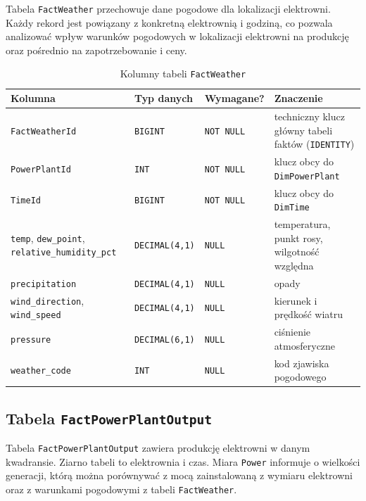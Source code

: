\documentclass[12pt]{article}
\begin{document}
	Tabela \texttt{FactWeather} przechowuje dane pogodowe dla lokalizacji elektrowni. Każdy rekord jest powiązany z konkretną elektrownią i godziną, co pozwala analizować wpływ warunków pogodowych w lokalizacji elektrowni na produkcję oraz pośrednio na zapotrzebowanie i ceny.

	\begin{table}[H]
		\centering
		\small
		\begin{tabularx}{\textwidth}{|p{4.0cm}|p{2.2cm}|p{2.5cm}|X|}
			\hline
			\textbf{Kolumna} & \textbf{Typ danych} & \textbf{Wymagane?} & \textbf{Znaczenie} \\
			\hline
			\texttt{FactWeatherId} & \texttt{BIGINT} & \texttt{NOT NULL} & techniczny klucz główny tabeli faktów (\texttt{IDENTITY}) \\
			\hline
			\texttt{PowerPlantId} & \texttt{INT} & \texttt{NOT NULL} & klucz obcy do \texttt{DimPowerPlant} \\
			\hline
			\texttt{TimeId} & \texttt{BIGINT} & \texttt{NOT NULL} & klucz obcy do \texttt{DimTime} \\
			\hline
			\texttt{temp}, \texttt{dew\_point}, \texttt{relative\_humidity\_pct} & \texttt{DECIMAL(4,1)} & \texttt{NULL} & temperatura, punkt rosy, wilgotność względna \\
			\hline
			\texttt{precipitation} & \texttt{DECIMAL(4,1)} & \texttt{NULL} & opady \\
			\hline
			\texttt{wind\_direction}, \texttt{wind\_speed} & \texttt{DECIMAL(4,1)} & \texttt{NULL} & kierunek i prędkość wiatru \\
			\hline
			\texttt{pressure} & \texttt{DECIMAL(6,1)} & \texttt{NULL} & ciśnienie atmosferyczne \\
			\hline
			\texttt{weather\_code} & \texttt{INT} & \texttt{NULL} & kod zjawiska pogodowego \\
			\hline
		\end{tabularx}
		\caption{Kolumny tabeli \texttt{FactWeather}}
	\end{table}

	\subsection{Tabela \texttt{FactPowerPlantOutput}}

	Tabela \texttt{FactPowerPlantOutput} zawiera produkcję elektrowni w danym kwadransie. Ziarno tabeli to elektrownia i czas. Miara \texttt{Power} informuje o wielkości generacji, którą można porównywać z mocą zainstalowaną z wymiaru elektrowni oraz z warunkami pogodowymi z tabeli \texttt{FactWeather}.
\end{document}
